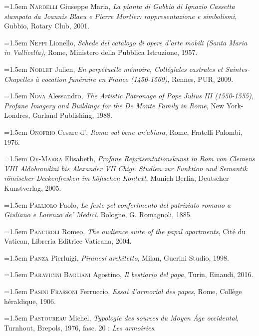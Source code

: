 \documentclass[12pt,twoside,openany]{book}
\newenvironment{PurhBibliography}
  {%
    \par
    \setlength{\parindent}{0pt}%
    \setlength{\leftskip}{0pt}%
  }
  {%
    \par
  }
\begin{document}
\begin{PurhBibliography}
\noindent\hangindent=1.5em \textsc{Nardelli} Giuseppe Maria, \textit{La pianta di Gubbio di Ignazio Cassetta stampata da Joannis Blaeu e Pierre Mortier: rappresentazione e simbolismi}, Gubbio, Rotary Club, 2001.\par
\noindent\hangindent=1.5em \textsc{Neppi} Lionello, \textit{Schede del catalogo di opere d’arte mobili (Santa Maria in Vallicella)}, Rome, Ministero della Pubblica Istruzione, 1957.\par
\noindent\hangindent=1.5em \textsc{Noblet} Julien, \textit{En perpétuelle mémoire, Collégiales castrales et Saintes-Chapelles à vocation funéraire en France (1450-1560)}, Rennes, PUR, 2009.\par
\noindent\hangindent=1.5em \textsc{Nova} Alessandro, \textit{The Artistic Patronage of Pope Julius III (1550-1555), Profane Imagery and Buildings for the De Monte Family in Rome}, New York-Londres, Garland Publishing, 1988.\par
\noindent\hangindent=1.5em \textsc{Onofrio} Cesare d’, \textit{Roma val bene un’abiura}, Rome, Fratelli Palombi, 1976.\par
\noindent\hangindent=1.5em \textsc{Oy}-\textsc{Marra} Elisabeth, \textit{Profane Repräsentationskunst in Rom von Clemens VIII Aldobrandini bis Alexander VII Chigi. Studien zur Funktion und Semantik römischer Deckenfresken im höfischen Kontext}, Munich-Berlin, Deutscher Kunstverlag, 2005.\par
\noindent\hangindent=1.5em \textsc{Palliolo} Paolo, \textit{Le feste pel conferimento del patriziato romano a Giuliano e Lorenzo de’ Medici}. Bologne, G. Romagnoli, 1885.\par
\noindent\hangindent=1.5em \textsc{Panciroli} Romeo, \textit{The audience suite of the papal apartments}, Cité du Vatican, Libreria Editrice Vaticana, 2004.\par
\noindent\hangindent=1.5em \textsc{Panza} Pierluigi, \textit{Piranesi architetto}, Milan, Guerini Studio, 1998.\par
\noindent\hangindent=1.5em \textsc{Paravicini Bagliani} Agostino, \textit{Il bestiario del papa}, Turin, Einaudi, 2016.\par
\noindent\hangindent=1.5em \textsc{Pasini Frassoni} Ferruccio, \textit{Essai d’armorial des papes}, Rome, Collège héraldique, 1906.\par
\noindent\hangindent=1.5em \textsc{Pastoureau} Michel, \textit{Typologie des sources du Moyen Âge occidental}, Turnhout, Brepols, 1976, fasc. 20 : \textit{Les armoiries}.\par

\end{PurhBibliography}
\end{document}
